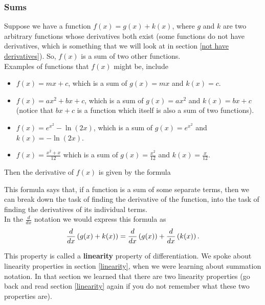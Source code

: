 \subsubsection{Sums} \label{linear derivatives}
Suppose we have a function $f(x) = g(x) + k(x)$, where $g$ and $k$ are two arbitrary functions whose derivatives both exist (some functions do not have derivatives, which is something that we will look at in section \ref{not have derivatives}). So, $f(x)$ is a sum of two other functions. \\

\noindent Examples of functions that $f(x)$ might be, include 
\begin{itemize}
\item $f(x) = mx + c$, which is a sum of $g(x) = mx$ and $k(x) = c$. 
\item $f(x) = ax^2 + bx + c$, which is a sum of $g(x) = ax^2$ and $k(x) = bx + c$ (notice that $bx+c$ is a function which itself is also a sum of two functions).
\item $f(x) = e^{x^2} - \ln(2x)$, which is a sum of $g(x) = e^{x^2}$ and $k(x) = -\ln(2x)$.
\item $f(x) = \displaystyle{\frac{x^2 + x}{12}}$ which is a sum of $g(x) = \frac{x^2}{12}$ and $k(x) = \frac{x}{12}.$ 
\end{itemize}

\noindent Then the derivative of $f(x)$ is given by the formula

  	\bigskip
	
	\hfil{}
	\bigskip
	\bigskip

\noindent This formula says that, if a function is a sum of some separate terms, then we can break down the task of finding the derivative of the function, into the task of finding the derivatives of its individual terms.\\

\noindent In the $\frac{d}{dx}$ notation we would express this formula as
\[
\frac{d}{dx}\left(g(x) + k(x)\right) = \frac{d}{dx}\left(g(x)\right) + \frac{d}{dx}\left(k(x)\right).
\]

\noindent This property is called a \textbf{linearity} property of differentiation. We spoke about linearity properties in section \ref{linearity}, when we were learning about summation notation. In that section we learned that there are two linearity properties (go back and read section \ref{linearity} again if you do not remember what these two properties are). \label{linearity (differentiation)} \\

